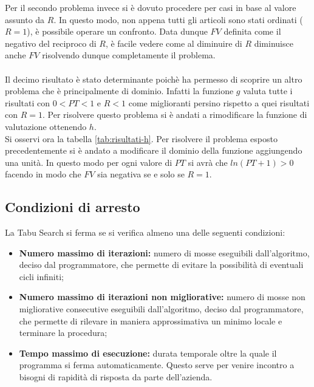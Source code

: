 \noindent Per il secondo problema invece si è dovuto procedere per casi in
base al valore assunto da $R$. In questo modo, non appena
tutti gli articoli sono stati ordinati ($R=1$), è possibile operare
un confronto.
Data dunque $FV$ definita come il negativo del reciproco di $R$,
è facile vedere come al diminuire di $R$ diminuisce anche $FV$
risolvendo dunque completamente il problema.\\\\

\noindent Il decimo risultato è stato determinante poichè ha permesso di
scoprire un altro problema che è principalmente di dominio.
Infatti la funzione $g$ valuta tutte i risultati con $0 < PT < 1$
e $R<1$ come miglioranti persino rispetto a quei
risultati con $R=1$. Per risolvere questo problema si è andati
a rimodificare la funzione di valutazione ottenendo $h$.\\

\noindent Si osservi ora la tabella \ref{tab:risultati-h}.
Per risolvere il problema esposto precedentemente si è andato
a modificare il dominio della funzione aggiungendo una unità.
In questo modo per ogni valore di $PT$ si avrà che
$ln(PT+1)>0$ facendo in modo che $FV$ sia negativa se e solo se
$R=1$.

\subsection{Condizioni di arresto}
\label{sec:condizioni-arresto}
\noindent La Tabu Search si ferma se si verifica almeno una delle seguenti condizioni:
\begin{itemize}
    \item \textbf{Numero massimo di iterazioni:} numero di mosse eseguibili dall'algoritmo, deciso
    dal programmatore, che permette di evitare la possibilità di eventuali cicli infiniti;
    \item \textbf{Numero massimo di iterazioni non migliorative:} numero di mosse non migliorative
    consecutive eseguibili dall'algoritmo, deciso dal programmatore, che permette
    di rilevare in maniera approssimativa un minimo
    locale e terminare la procedura;
    \item \textbf{Tempo massimo di esecuzione:}  durata temporale oltre
    la quale il programma si ferma automaticamente. Questo serve per venire incontro a
    bisogni di rapidità di risposta da parte dell’azienda.
    
\end{itemize}
